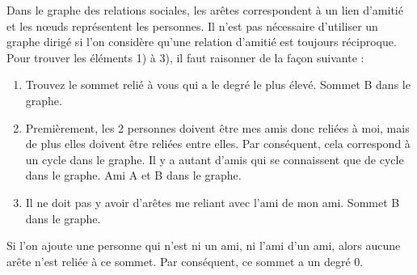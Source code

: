 \begin{Exercice}[10 minutes]
    \begin{solution}
        Dans le graphe des relations sociales, les arêtes correspondent à un lien d'amitié et les nœuds représentent les personnes. Il n'est pas nécessaire d'utiliser un graphe dirigé si l'on considère qu'une relation d'amitié est toujours réciproque.\\
        
        Pour trouver les éléments 1) à 3), il faut raisonner de la façon suivante :
        \begin{enumerate}
            \item Trouvez le sommet relié à vous qui a le degré le plus élevé. Sommet B dans le graphe.
            \item Premièrement, les 2 personnes doivent être mes amis donc reliées à moi, mais de  plus elles doivent être reliées entre elles. Par conséquent, cela correspond à un cycle dans le graphe. Il y a autant d'amis qui se connaissent que de cycle dans le graphe. Ami A et B dans le graphe.
            \item Il ne doit pas y avoir d'arêtes me reliant avec l'ami de mon ami. Sommet B dans le graphe.
        \end{enumerate}
        
        Si l'on ajoute une personne qui n'est ni un ami, ni l'ami d'un ami, alors aucune arête n'est reliée à ce sommet. Par conséquent, ce sommet a un degré 0.
    \end{solution} 
\end{Exercice}
